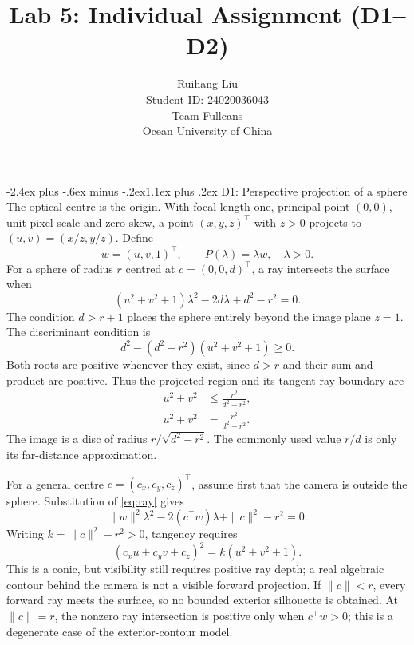 \documentclass[12pt,a4paper,twoside]{article}
\title{\Large Lab 5: Individual Assignment (D1--D2)}
\author{Ruihang Liu\\[2pt]\normalsize Student ID: 24020036043\\
  \normalsize Team Fullcans\\
  \normalsize Ocean University of China}
\date{}
\makeatletter
\renewcommand\section{\@startsection{section}{1}{\z@}%
  {-2.4ex plus -.6ex minus -.2ex}{1.1ex plus .2ex}%
  {\normalfont\normalsize\bfseries}}
\makeatother
\begin{document}
\makeatletter
{}
\makeatother
\thispagestyle{fancy}

\section{D1: Perspective projection of a sphere}
The optical centre is the origin. With focal length one, principal point
$(0,0)$, unit pixel scale and zero skew, a point $(x,y,z)^\top$ with $z>0$
projects to $(u,v)=(x/z,y/z)$. Define
\begin{equation}
  w=(u,v,1)^\top,\qquad P(\lambda)=\lambda w,\quad \lambda>0.
  \label{eq:ray}
\end{equation}
For a sphere of radius $r$ centred at $c=(0,0,d)^\top$, a ray intersects the
surface when
\begin{equation}
  (u^2+v^2+1)\lambda^2-2d\lambda+d^2-r^2=0.
\end{equation}
The condition $d>r+1$ places the sphere entirely beyond the image plane
$z=1$. The discriminant condition is
\begin{equation}
  d^2-(d^2-r^2)(u^2+v^2+1)\geq0.
\end{equation}
Both roots are positive whenever they exist, since $d>r$ and their sum and
product are positive. Thus the projected region and its tangent-ray boundary
are
\begin{align}
  u^2+v^2&\leq\frac{r^2}{d^2-r^2},\\
  u^2+v^2&=\frac{r^2}{d^2-r^2}.
  \label{eq:circle}
\end{align}
The image is a disc of radius $r/\sqrt{d^2-r^2}$. The commonly used value
$r/d$ is only its far-distance approximation.

For a general centre $c=(c_x,c_y,c_z)^\top$, assume first that the camera is
outside the sphere. Substitution of \eqref{eq:ray} gives
\begin{equation}
  \|w\|^2\lambda^2-2(c^\top w)\lambda+\|c\|^2-r^2=0.
\end{equation}
Writing $k=\|c\|^2-r^2>0$, tangency requires
\begin{equation}
  (c_xu+c_yv+c_z)^2=k(u^2+v^2+1).
  \label{eq:conic}
\end{equation}
This is a conic, but visibility still requires positive ray depth; a real
algebraic contour behind the camera is not a visible forward projection.
If $\|c\|<r$, every forward ray meets the surface, so no bounded exterior
silhouette is obtained. At $\|c\|=r$, the nonzero ray intersection is positive
only when $c^\top w>0$; this is a degenerate case of the exterior-contour model.
\end{document}
